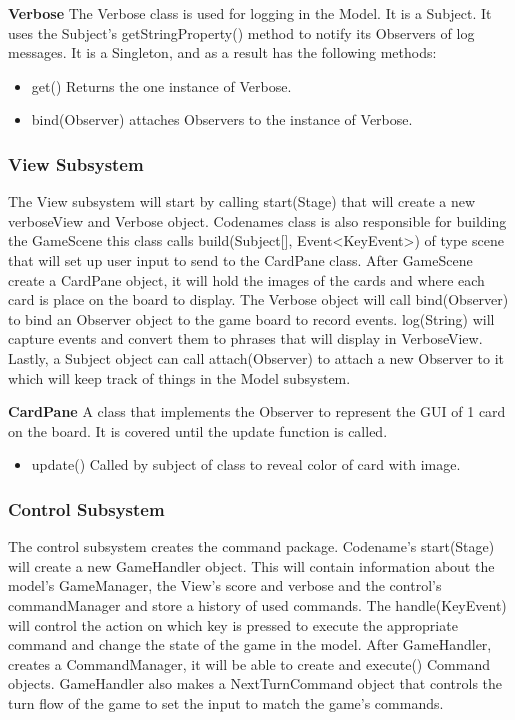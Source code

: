 \textbf{Verbose} The Verbose class is used for logging in the Model. It is a Subject. It uses the Subject's getStringProperty() method to notify its Observers of log messages. It is a Singleton, and as a result has the following methods:
\begin{itemize}
  \item get() Returns the one instance of Verbose.
  \item bind(Observer) attaches Observers to the instance of Verbose.
\end{itemize}

\subsubsection {View Subsystem}
The View subsystem will start by calling start(Stage) that will create a new verboseView and Verbose object.
Codenames class is also responsible for building the GameScene this class calls build(Subject[], Event\textless KeyEvent\textgreater ) of type scene that will set up user input to send to the CardPane class. After GameScene create a CardPane object, it will hold the images of the cards and where each card is place on the board to display. The Verbose object will call bind(Observer) to bind an Observer object to the game board to record events. log(String) will capture events and convert them to phrases that will display in VerboseView. Lastly, a Subject object can call attach(Observer) to attach a new Observer to it which will keep track of things in the Model subsystem.

\textbf{CardPane} A class that implements the Observer to represent the GUI of 1 card on the board. It is covered until the update function is called.
\begin{itemize}
  \item update() Called by subject of class to reveal color of card with image.
\end{itemize}

\subsubsection {Control Subsystem}
The control subsystem creates the command package. Codename's start(Stage) will create a new GameHandler object. This will contain information about the model's GameManager, the View's score and verbose and the control's commandManager and store a history of used commands. The handle(KeyEvent) will control the action on which key is pressed to execute the appropriate command and change the state of the game in the model. After GameHandler, creates a CommandManager, it will be able to create and execute() Command objects. GameHandler also makes a NextTurnCommand object that controls the turn flow of the game to set the input to match the game's commands.\\

